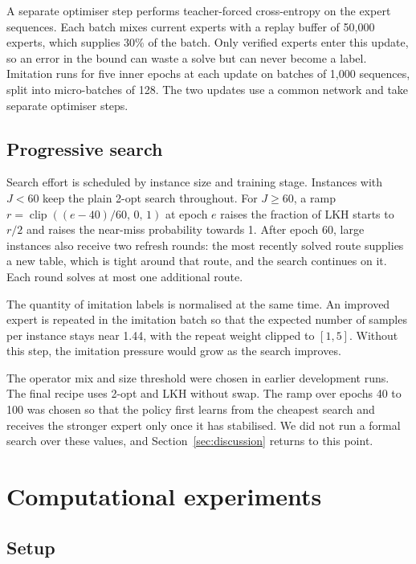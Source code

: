 \documentclass[preprint,12pt,authoryear]{elsarticle}
\begin{document}
A separate optimiser step performs teacher-forced cross-entropy on the expert sequences. Each batch mixes current experts with a replay buffer of 50,000 experts, which supplies 30\% of the batch. Only verified experts enter this update, so an error in the bound can waste a solve but can never become a label. Imitation runs for five inner epochs at each update on batches of 1,000 sequences, split into micro-batches of 128. The two updates use a common network and take separate optimiser steps.

\subsection{Progressive search}
\label{sec:recipe}

Search effort is scheduled by instance size and training stage. Instances with $J < 60$ keep the plain 2-opt search throughout. For $J \ge 60$, a ramp $r = \operatorname{clip}((e - 40)/60,\, 0,\, 1)$ at epoch $e$ raises the fraction of LKH starts to $r/2$ and raises the near-miss probability towards 1. After epoch 60, large instances also receive two refresh rounds: the most recently solved route supplies a new table, which is tight around that route, and the search continues on it. Each round solves at most one additional route.

The quantity of imitation labels is normalised at the same time. An improved expert is repeated in the imitation batch so that the expected number of samples per instance stays near 1.44, with the repeat weight clipped to $[1, 5]$. Without this step, the imitation pressure would grow as the search improves.

The operator mix and size threshold were chosen in earlier development runs. The final recipe uses 2-opt and LKH without swap. The ramp over epochs 40 to 100 was chosen so that the policy first learns from the cheapest search and receives the stronger expert only once it has stabilised. We did not run a formal search over these values, and Section~\ref{sec:discussion} returns to this point.

\section{Computational experiments}
\label{sec:experiments}

\subsection{Setup}
\end{document}
